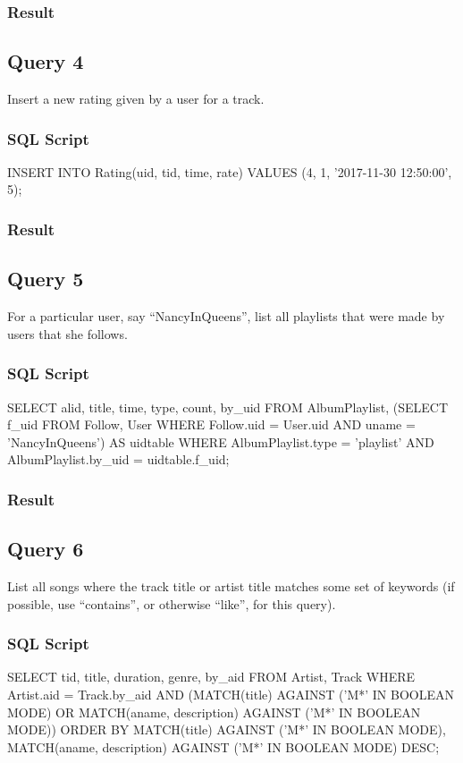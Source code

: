 \documentclass[letterpaper, 12pt]{report}
\begin{document}
	\subsubsection{Result}
	
	\subsection{Query 4}
	Insert a new rating given by a user for a track.
	\subsubsection{SQL Script}
	\begin{spverbatim}
		INSERT INTO Rating(uid, tid, time, rate) VALUES (4, 1, '2017-11-30 12:50:00', 5);
	\end{spverbatim}
	\subsubsection{Result}
	
	\subsection{Query 5}
	For a particular user, say “NancyInQueens”, list all playlists that were made by users that she follows.
	\subsubsection{SQL Script}
	\begin{spverbatim}
		SELECT alid, title, time, type, count, by_uid FROM AlbumPlaylist,
		(SELECT f_uid FROM Follow, User
		WHERE Follow.uid = User.uid
		AND uname = 'NancyInQueens') AS uidtable
		WHERE AlbumPlaylist.type = 'playlist'
		AND AlbumPlaylist.by_uid = uidtable.f_uid;
	\end{spverbatim}
	\subsubsection{Result}
	
	\subsection{Query 6}
	List all songs where the track title or artist title matches some set of keywords (if possible, use
	``contains'', or otherwise ``like'', for this query).
	
	\subsubsection{SQL Script}
	\begin{spverbatim}
		SELECT tid, title, duration, genre, by_aid FROM Artist, Track 
		WHERE Artist.aid = Track.by_aid
		AND (MATCH(title)
		AGAINST ('M*' IN BOOLEAN MODE)
		OR MATCH(aname, description)
		AGAINST ('M*' IN BOOLEAN MODE))
		ORDER BY MATCH(title)
		AGAINST ('M*' IN BOOLEAN MODE),
		MATCH(aname, description)
		AGAINST ('M*' IN BOOLEAN MODE) DESC;
	\end{spverbatim}
\end{document}
